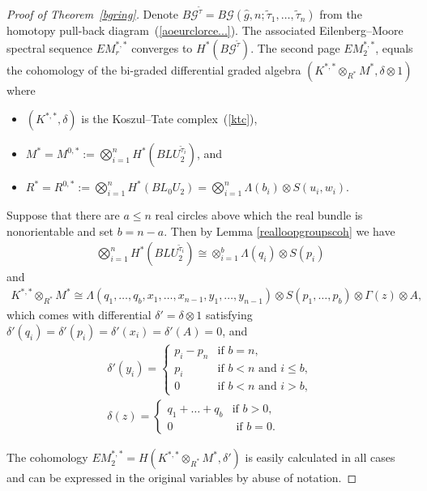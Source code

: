 \documentclass[pdftex]{sigma}
\numberwithin{equation}{section}
\begin{document}
\begin{proof}[Proof of Theorem~\ref{bgring}]
Denote $B{\mathcal G}^{{\tilde{\tau}}} = B{\mathcal G}(\hat{g}, n; {\tilde{\tau}}_1,\dots,{\tilde{\tau}}_n)$ from the homotopy pull-back diag\-ram~(\ref{aoeurclorce...}). The associated Eilenberg--Moore spectral sequence $EM_r^{*,*}$ converges to $H^*(B{\mathcal G}^{{\tilde{\tau}}})$. The second page $EM_2^{*,*}$, equals the cohomology of the bi-graded dif\/ferential graded algebra $ (K^{*,*} \otimes_{R^*} M^*, \delta \otimes 1) $
where
\begin{itemize}\itemsep=0pt
	\item $(K^{*,*}, \delta)$ is the Koszul--Tate complex~(\ref{ktc}),
	\item $M^* = M^{0,*} := \bigotimes_{i=1}^n H^*(BLU_2^{{\tilde{\tau}}_i})$, and
	\item $R^* = R^{0,*}:= \bigotimes_{i=1}^n H^*(BL_0U_2) = \bigotimes_{i=1}^n \Lambda(b_i) \otimes S(u_i,w_i). $
\end{itemize}
Suppose that there are $a \leq n$ real circles above which the real bundle is nonorientable and set $b = n-a$. Then by Lemma \ref{realloopgroupscoh} we have
\begin{gather*} \bigotimes_{i=1}^n H^*(BLU_2^{{\tilde{\tau}}_i}) \cong \otimes_{i=1}^{b} \Lambda(q_i) \otimes S(p_i)\end{gather*}
and
\begin{gather*} K^{*,*} \otimes_{R^*} M^* \cong \Lambda(q_1,\dots,q_{b}, x_1,\dots,x_{n-1}, y_1,\dots,y_{n-1}) \otimes S(p_1,\dots,p_{b}) \otimes \Gamma(z) \otimes A,
\end{gather*}
which comes with dif\/ferential $\delta' = \delta \otimes 1$ satisfying $\delta'(q_i) = \delta'(p_i) = \delta'(x_i) = \delta'(A) = 0$, and
\begin{gather*}\delta'(y_i) = \begin{cases}
 p_i -p_n & \text{if $b=n$}, \\
 p_i & \text{if $b<n$ and $i\leq b$},\\
 0 & \text{if $b<n$ and $i > b$},
 \end{cases}\\
\delta(z) = \begin{cases} q_1 +\dots+q_{b} & \text{if $b >0$},
\\ 0 & \text{ if $b =0$}. \end{cases}
\end{gather*}

The cohomology $EM_2^{*,*} =H(K^{*,*} \otimes_{R^*} M^*, \delta')$ is easily calculated in all cases and can be expressed in the original variables by abuse of notation.


\end{proof}
\end{document}
